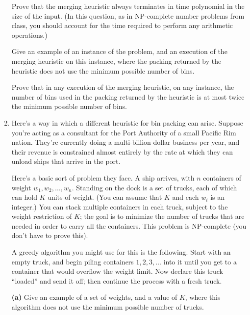 \documentclass[12pt]{article}
\begin{document}
\begin{enumerate}
Prove that the merging heuristic always terminates in time
polynomial in the size of the input.
(In this question, as in NP-complete number problems from class,
you should account for the time required to perform
any arithmetic operations.)

\bigskip
{}
Give an example of an instance
of the problem, and an execution of the merging heuristic
on this instance, where the packing returned by
the heuristic does not use the minimum possible number of bins.

\bigskip
{}
Prove that in any execution of the merging heuristic,
on any instance,
the number of bins used in the packing returned by
the heuristic is at most twice the minimum possible number
of bins.


\item

Here's a way in which a different heuristic for
bin packing can arise.
Suppose you're acting as a consultant
for the Port Authority of a small Pacific Rim nation.
They're currently doing a multi-billion dollar business
per year, and their revenue is constrained almost entirely
by the rate at which they can unload ships that arrive in the port.

Here's a basic sort of problem they face.
A ship arrives, with $n$ containers of weight
$w_1, w_2, \ldots, w_n$.
Standing on the dock is a set of trucks, each of
which can hold $K$ units of weight.
(You can assume that $K$ and each $w_i$ is an integer.)
You can stack multiple containers in each truck,
subject to the weight restriction of $K$;
the goal is to minimize the number of trucks that are
needed in order to carry all the containers.
This problem is NP-complete (you don't have to prove this).

A greedy algorithm you might use for this is the following.
Start with an empty truck, and begin piling containers
$1, 2, 3, \ldots $ into it until you get to a container
that would overflow the weight limit.
Now declare this truck ``loaded'' and send it off;
then continue the process with a fresh truck.

{\bf (a)} Give an example of a set of weights, and
a value of $K$, where this algorithm does not use the
minimum possible number of trucks.


\end{enumerate}
\end{document}
